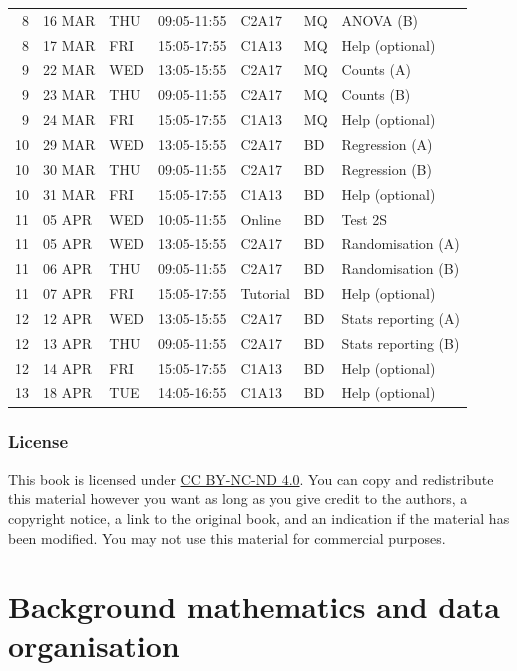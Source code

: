 \documentclass[
]{scrbook}
\begin{document}
\begin{longtable}[]{@{}rllllll@{}}
8 & 16 MAR & THU & 09:05-11:55 & C2A17 & MQ & ANOVA (B) \\
8 & 17 MAR & FRI & 15:05-17:55 & C1A13 & MQ & Help (optional) \\
9 & 22 MAR & WED & 13:05-15:55 & C2A17 & MQ & Counts (A) \\
9 & 23 MAR & THU & 09:05-11:55 & C2A17 & MQ & Counts (B) \\
9 & 24 MAR & FRI & 15:05-17:55 & C1A13 & MQ & Help (optional) \\
10 & 29 MAR & WED & 13:05-15:55 & C2A17 & BD & Regression (A) \\
10 & 30 MAR & THU & 09:05-11:55 & C2A17 & BD & Regression (B) \\
10 & 31 MAR & FRI & 15:05-17:55 & C1A13 & BD & Help (optional) \\
11 & 05 APR & WED & 10:05-11:55 & Online & BD & Test 2S \\
11 & 05 APR & WED & 13:05-15:55 & C2A17 & BD & Randomisation (A) \\
11 & 06 APR & THU & 09:05-11:55 & C2A17 & BD & Randomisation (B) \\
11 & 07 APR & FRI & 15:05-17:55 & Tutorial & BD & Help (optional) \\
12 & 12 APR & WED & 13:05-15:55 & C2A17 & BD & Stats reporting (A) \\
12 & 13 APR & THU & 09:05-11:55 & C2A17 & BD & Stats reporting (B) \\
12 & 14 APR & FRI & 15:05-17:55 & C1A13 & BD & Help (optional) \\
13 & 18 APR & TUE & 14:05-16:55 & C1A13 & BD & Help (optional) \\
\bottomrule
\end{longtable}

\hypertarget{license}{%
\section*{License}\label{license}}

This book is licensed under \href{https://creativecommons.org/licenses/by-nc-nd/4.0/}{CC BY-NC-ND 4.0}.
You can copy and redistribute this material however you want as long as you give credit to the authors, a copyright notice, a link to the original book, and an indication if the material has been modified.
You may not use this material for commercial purposes.

\hypertarget{part-background-mathematics-and-data-organisation}{%
\part{Background mathematics and data organisation}\label{part-background-mathematics-and-data-organisation}}
\end{document}
